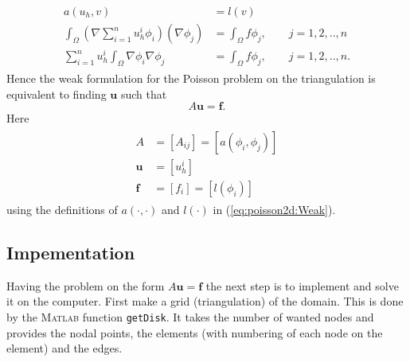 \documentclass[paper=a4, fontsize=11pt]{scrartcl} %
\begin{document}
\begin{eqnarray}
\begin{aligned}
\nonumber
a(u_h,v) &= l(v) \\
\int_{\Omega}(\nabla\sum\limits_{i=1}^n u^i_h\phi_i)(\nabla\phi_j) &= \int_{\Omega}\! f \phi_j, \qquad j=1,2,..,n \\
\sum\limits_{i=1}^n u^i_h\int_{\Omega}\nabla\phi_i \nabla\phi_j &= \int_{\Omega}\! f \phi_j, \qquad j=1,2,..,n.
\end{aligned}
\end{eqnarray}
Hence the weak formulation for the Poisson problem on the triangulation is equivalent to finding $\mathbf{u}$ such that
\[A\mathbf{u}=\mathbf{f}.\]  
Here
\begin{eqnarray}
\begin{aligned}
\nonumber
A &= [A_{ij}]=[a(\phi_i,\phi_j)]\\
\mathbf{u} &= [u_{h}^i] \\
\mathbf{f} &= [f_i]=[l(\phi_i)]
\end{aligned}
\end{eqnarray}
using the definitions of $a(\cdot,\cdot)$ and $l(\cdot)$ in (\ref{eq:poisson2d:Weak}).

\subsection{Impementation}
Having the problem on the form $A\mathbf{u}=\mathbf{f}$ the next step is to implement and solve it on the computer. First make a grid (triangulation) of the domain. This is done by the \textsc{Matlab} function \texttt{getDisk}. It takes the number of wanted nodes and provides the nodal points, the elements (with numbering of each node on the element) and the edges.
\end{document}
